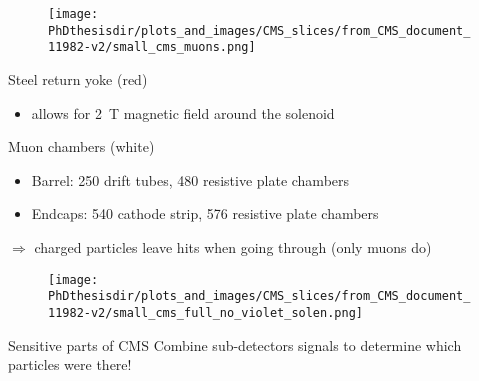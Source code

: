 \begin{frame}
\addtocounter{framenumber}{-1}
\transdissolve
\begin{minipage}[t]{.6\textwidth}
\begin{figure}
\texttt{[image: \\PhDthesisdir/plots\_and\_images/CMS\_slices/from\_CMS\_document\_11982-v2/small\_cms\_muons.png]}
\end{figure}
\end{minipage}
\hfill\begin{minipage}[t]{.35\textwidth}
\begin{block}{Steel return yoke (red)}
\begin{itemize}
\item allows for \SI{2}{\tesla} magnetic field around the solenoid
\end{itemize}
\end{block}

\begin{block}{Muon chambers (white)}
\begin{itemize}
\item Barrel: \num{250} drift tubes, \num{480} resistive plate chambers
\item Endcaps: \num{540} cathode strip, \num{576} resistive plate chambers
\end{itemize}
\end{block}

\begin{block}{}
$\Rightarrow$ charged particles leave hits when going through (only muons do)
\end{block}
\vspace{-2\baselineskip}
\end{minipage}
\end{frame}

\begin{frame}
\addtocounter{framenumber}{-1}
\transdissolve
\begin{minipage}[t]{.6\textwidth}
\begin{figure}
\texttt{[image: \\PhDthesisdir/plots\_and\_images/CMS\_slices/from\_CMS\_document\_11982-v2/small\_cms\_full\_no\_violet\_solen.png]}
\end{figure}
\end{minipage}
\hfill\begin{minipage}[t]{.35\textwidth}
\begin{block}{Sensitive parts of CMS}
Combine sub-detectors signals to determine which particles were there!
\end{block}
\end{minipage}
\end{frame}